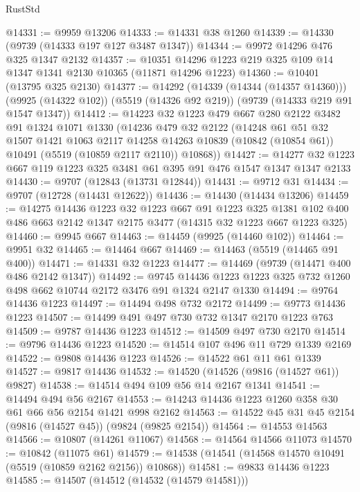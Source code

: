 \begin{lexlean}{RustStd}
\begin{coremodule}
@14331 := @9959 @13206
@14333 := @14331 @38 @1260
@14339 := @14330 (@9739 (@14333 @197 @127 @3487 @1347))
@14344 := @9972 @14296 @476 @325 @1347 @2132
@14357 := @10351 @14296 @1223 @219 @325 @109 @14 @1347 @1341 @2130 @10365 (@11871 @14296 @1223)
@14360 := @10401 (@13795 @325 @2130)
@14377 := @14292
    (@14339 (@14344 (@14357 @14360)))
    (@9925 (@14322 @102))
    (@5519 (@14326 @92 @219))
    (@9739 (@14333 @219 @91 @1547 @1347))
@14412 := @14223
    @32
    @1223
    @479
    @667
    @280
    @2122
    @3482
    @91
    @1324
    @1071
    @1330
    (@14236
      @479
      @32
      @2122
      (@14248
        @61
        @51
        @32
        @1507
        @1421
        @1063
        @2117
        @14258
        @14263
        @10839
        (@10842 (@10854 @61))
        @10491
        (@5519 (@10859 @2117 @2110))
        @10868))
@14427 := @14277 @32 @1223 @667 @119 @1223 @325 @3481 @61 @395 @91 @476 @1547 @1347 @1347 @2133
@14430 := @9707 (@12843 (@13731 @12844))
@14431 := @9712 @31
@14434 := @9707 (@12728 (@14431 @12622))
@14436 := @14430 (@14434 @13206)
@14459 := @14275
    @14436
    @1223
    @32
    @1223
    @667
    @91
    @1223
    @325
    @1381
    @102
    @400
    @486
    @663
    @2142
    @1347
    @2175
    @3477
    (@14315 @32 @1223 @667 @1223 @325)
@14460 := @9945 @667
@14463 := @14459 (@9925 (@14460 @102))
@14464 := @9951 @32
@14465 := @14464 @667
@14469 := @14463 (@5519 (@14465 @91 @400))
@14471 := @14331 @32 @1223
@14477 := @14469 (@9739 (@14471 @400 @486 @2142 @1347))
@14492 := @9745
    @14436
    @1223
    @1223
    @325
    @732
    @1260
    @498
    @662
    @10744
    @2172
    @3476
    @91
    @1324
    @2147
    @1330
@14494 := @9764 @14436 @1223
@14497 := @14494 @498 @732 @2172
@14499 := @9773 @14436 @1223
@14507 := @14499 @491 @497 @730 @732 @1347 @2170 @1223 @763
@14509 := @9787 @14436 @1223
@14512 := @14509 @497 @730 @2170
@14514 := @9796 @14436 @1223
@14520 := @14514 @107 @496 @11 @729 @1339 @2169
@14522 := @9808 @14436 @1223
@14526 := @14522 @61 @11 @61 @1339
@14527 := @9817 @14436
@14532 := @14520 (@14526 (@9816 (@14527 @61)) @9827)
@14538 := @14514 @494 @109 @56 @14 @2167 @1341
@14541 := @14494 @494 @56 @2167
@14553 := @14243 @14436 @1223 @1260 @358 @30 @61 @66 @56 @2154 @1421 @998 @2162
@14563 := @14522 @45 @31 @45 @2154 (@9816 (@14527 @45)) (@9824 (@9825 @2154))
@14564 := @14553 @14563
@14566 := @10807 (@14261 @11067)
@14568 := @14564 @14566 @11073
@14570 := @10842 (@11075 @61)
@14579 := @14538 (@14541 (@14568 @14570 @10491 (@5519 (@10859 @2162 @2156)) @10868))
@14581 := @9833 @14436 @1223
@14585 := @14507 (@14512 (@14532 (@14579 @14581)))

\end{coremodule}
\end{lexlean}
